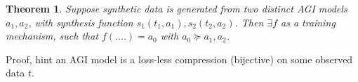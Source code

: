 \documentclass[10pt,reqno]{amsart}
\newtheorem{thm}{Theorem} [section]
\theoremstyle{definition}
\theoremstyle{remark}
\numberwithin{equation}{section}
\begin{document}
\begin{thm}
Suppose synthetic data is generated from two distinct AGI models $a_1,a_2$, with synthesis function $s_1(t_1,a_1) , s_2(t_2,a_2)$. Then $\exists f$ as a training mechanism, such that $f(....)=a_0$ with $a_0\succeq a_1,a_2$.
\end{thm}
Proof, hint an AGI model is a loss-less compression (bijective) on some observed data $t$.

\begin{thebibliography}{}

\end{thebibliography}
\end{document}
